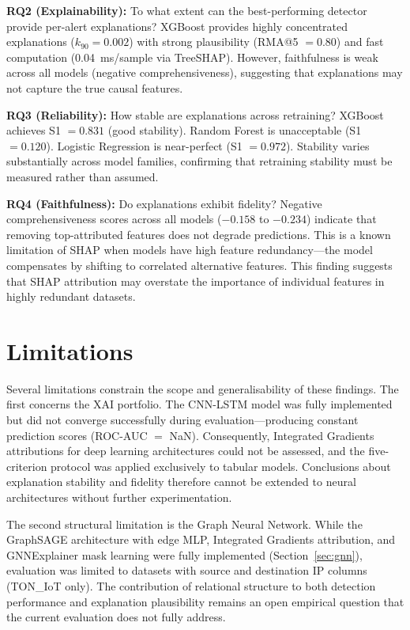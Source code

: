 \documentclass[12pt,a4paper]{report}
\begin{document}
\textbf{RQ2 (Explainability):} To what extent can the best-performing detector provide per-alert explanations? XGBoost provides highly concentrated explanations ($k_{90} = 0.002$) with strong plausibility (RMA@5 $= 0.80$) and fast computation (0.04~ms/sample via TreeSHAP). However, faithfulness is weak across all models (negative comprehensiveness), suggesting that explanations may not capture the true causal features.

\textbf{RQ3 (Reliability):} How stable are explanations across retraining? XGBoost achieves S1 $= 0.831$ (good stability). Random Forest is unacceptable (S1 $= 0.120$). Logistic Regression is near-perfect (S1 $= 0.972$). Stability varies substantially across model families, confirming that retraining stability must be measured rather than assumed.

\textbf{RQ4 (Faithfulness):} Do explanations exhibit fidelity? Negative comprehensiveness scores across all models ($-0.158$ to $-0.234$) indicate that removing top-attributed features does not degrade predictions. This is a known limitation of SHAP when models have high feature redundancy---the model compensates by shifting to correlated alternative features. This finding suggests that SHAP attribution may overstate the importance of individual features in highly redundant datasets.

\section{Limitations}
\label{sec:limitations}

Several limitations constrain the scope and generalisability of these findings. The first concerns the XAI portfolio. The CNN-LSTM model was fully implemented but did not converge successfully during evaluation---producing constant prediction scores (ROC-AUC $=$ NaN). Consequently, Integrated Gradients attributions for deep learning architectures could not be assessed, and the five-criterion protocol was applied exclusively to tabular models. Conclusions about explanation stability and fidelity therefore cannot be extended to neural architectures without further experimentation.

The second structural limitation is the Graph Neural Network. While the GraphSAGE architecture with edge MLP, Integrated Gradients attribution, and GNNExplainer mask learning were fully implemented (Section~\ref{sec:gnn}), evaluation was limited to datasets with source and destination IP columns (TON\_IoT only). The contribution of relational structure to both detection performance and explanation plausibility remains an open empirical question that the current evaluation does not fully address.
\end{document}
